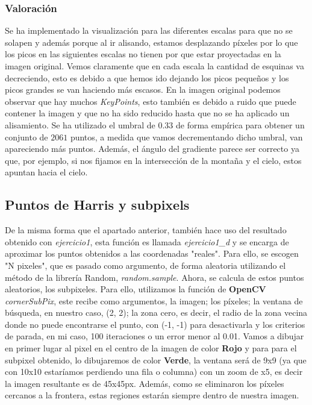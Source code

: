 \documentclass{article}
\begin{document}
\subsubsection{Valoración}
Se ha implementado la visualización para las diferentes escalas para que no se solapen y además porque al ir alisando, estamos desplazando píxeles por lo que los picos en las siguientes escalas no tienen por que estar proyectadas en la imagen original.
\newline
Vemos claramente que en cada escala la cantidad de esquinas va decreciendo, esto es debido a que hemos ido dejando los picos pequeños y los picos grandes se van haciendo más escasos. En la imagen original podemos observar que hay muchos \textit{KeyPoints}, esto también es debido a ruido que puede contener la imagen y que no ha sido reducido hasta que no se ha aplicado un alisamiento. 
\newline
Se ha utilizado el umbral de $0.33$ de forma empírica para obtener un conjunto de $2061$ puntos, a medida que vamos decrementando dicho umbral, van apareciendo más puntos. \newline Además, el ángulo del gradiente parece ser correcto ya que, por ejemplo, si nos fijamos en la intersección de la montaña y el cielo, estos apuntan hacia el cielo.


\subsection{Puntos de Harris y subpixels}
De la misma forma que el apartado anterior, también hace uso del resultado obtenido con \textit{ejercicio1}, esta función es llamada \textit{ejercicio1\_d} y se encarga de aproximar los puntos obtenidos a las coordenadas "reales". Para ello, se escogen "N pixeles", que es pasado como argumento, de forma aleatoria utilizando el método de la librería Random, \textit{random.sample}. Ahora, se calcula de estos puntos aleatorios, los subpixeles. Para ello, utilizamos la función de \textbf{OpenCV} \textit{cornerSubPix}, este recibe como argumentos, la imagen; los píxeles; la ventana de búsqueda, en nuestro caso, (2, 2); la zona cero, es decir, el radio de la zona vecina donde no puede encontrarse el punto, con (-1, -1) para desactivarla y los criterios de parada, en mi caso, 100 iteraciones o un error menor al 0.01.
\newline
\newline
Vamos a dibujar en primer lugar al pixel en el centro de la imagen de color \textbf{Rojo} y para para el subpixel obtenido, lo dibujaremos de color \textbf{Verde}, la ventana será de 9x9 (ya que con 10x10 estaríamos perdiendo una fila o columna) con un zoom de x5, es decir la imagen resultante es de 45x45px. Además, como se eliminaron los píxeles cercanos a la frontera, estas regiones estarán siempre dentro de nuestra imagen.
\end{document}
